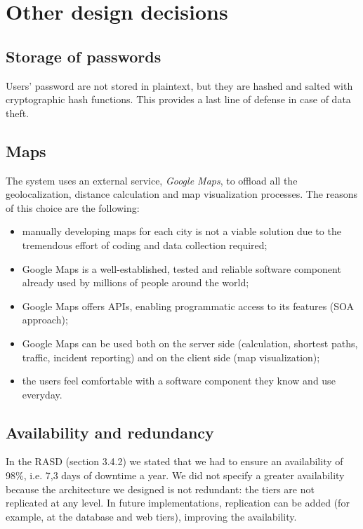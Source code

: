 \section{Other design decisions}
\label{sec:other-design-decisions}

\subsection{Storage of passwords}
Users' password are not stored in plaintext, but they are hashed and salted with cryptographic hash functions. This provides a last line of defense in case of data theft.

\subsection{Maps}
The system uses an external service, \emph{Google Maps}, to offload all the geolocalization, distance calculation and map visualization processes. The reasons of this choice are the following:
\begin{itemize}
    \item manually developing maps for each city is not a viable solution due to the tremendous effort of coding and data collection required;
    \item Google Maps is a well-established, tested and reliable software component already used by millions of people around the world;
    \item Google Maps offers APIs, enabling programmatic access to its features (SOA approach);
    \item Google Maps can be used both on the server side (calculation, shortest paths, traffic, incident reporting) and on the client side (map visualization);
    \item the users feel comfortable with a software component they know and use everyday.
\end{itemize}

\subsection{Availability and redundancy}
In the RASD (section 3.4.2) we stated that we had to ensure an availability of 98\%, i.e. 7,3 days of downtime a year.
We did not specify a greater availability because the architecture we designed is not redundant: the tiers are not replicated at any level.
In future implementations, replication can be added (for example, at the database and web tiers), improving the availability.
